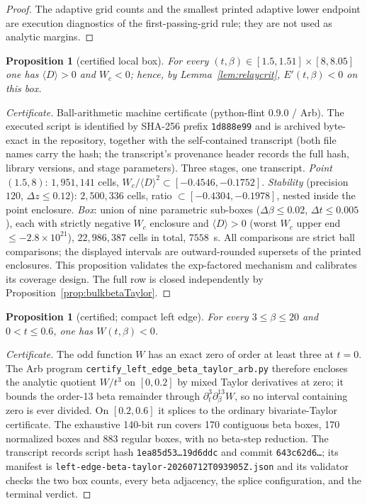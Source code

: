 \documentclass[11pt]{article}
\newtheorem{proposition}[theorem]{Proposition}
\theoremstyle{remark}
\begin{document}
\begin{proof}
The adaptive grid counts and the smallest printed adaptive lower endpoint
are execution diagnostics of the first-passing-grid rule; they are not used
as analytic margins.
\end{proof}

\begin{proposition}[certified local box]
\label{prop:localbox}
For every $(t,\beta)\in[1.5,1.51]\times[8,8.05]$ one has
$\langle D\rangle>0$ and $W_c<0$; hence, by
Lemma~\ref{lem:relaycrit}, $E'(t,\beta)<0$ on this box.
\end{proposition}

\begin{proof}[Certificate]
Ball-arithmetic machine certificate (python-flint 0.9.0 / Arb).
The executed script is identified by SHA-256 prefix
\texttt{1d888e99} and is archived byte-exact in the repository,
together with the self-contained transcript (both file names carry
the hash; the transcript's provenance header records the full hash,
library versions, and stage parameters). Three stages, one
transcript. \emph{Point} $(1.5,8)$: $1{,}951{,}141$ cells,
$W_c/\langle D\rangle^2\subset[-0.4546,-0.1752]$.
\emph{Stability} (precision $120$, $\Delta z\le 0.12$):
$2{,}500{,}336$ cells, ratio $\subset[-0.4304,-0.1978]$, nested
inside the point enclosure. \emph{Box}: union of nine parametric
sub-boxes ($\Delta\beta\le0.02$, $\Delta t\le0.005$), each with
strictly negative $W_c$ enclosure and $\langle D\rangle>0$ (worst
$W_c$ upper end $\le-2.8\times10^{21}$), $22{,}986{,}387$ cells in
total, $7558$~s. All comparisons are strict ball comparisons; the
displayed intervals are outward-rounded supersets of the printed
enclosures. This proposition validates the exp-factored mechanism and
calibrates its coverage design.  The full row is closed independently by
Proposition~\ref{prop:bulkbetaTaylor}.
\end{proof}

\begin{proposition}[certified; compact left edge]
\label{prop:compactLeftEdge}
For every $3\le\beta\le20$ and $0<t\le0.6$, one has
$W(t,\beta)<0$.
\end{proposition}

\begin{proof}[Certificate]
The odd function $W$ has an exact zero of order at least three at $t=0$.
The Arb program \texttt{certify\_left\_edge\_beta\_taylor\_arb.py}
therefore encloses the analytic quotient $W/t^3$ on $[0,0.2]$ by mixed
Taylor derivatives at zero; it bounds the order-13 beta remainder through
$\partial_t^3\partial_\beta^{13}W$, so no interval containing zero is ever
divided.  On $[0.2,0.6]$ it splices to the ordinary bivariate-Taylor
certificate.  The exhaustive 140-bit run covers 170 contiguous beta boxes,
170 normalized boxes and 883 regular boxes, with no beta-step reduction.
The transcript records script hash \texttt{1ea85d53\ldots19d6ddc} and
commit \texttt{643c62d6\ldots}; its manifest is
\texttt{left-edge-beta-taylor-20260712T093905Z.json} and its validator
checks the two box counts, every beta adjacency, the splice configuration,
and the terminal verdict.
\end{proof}
\end{document}
